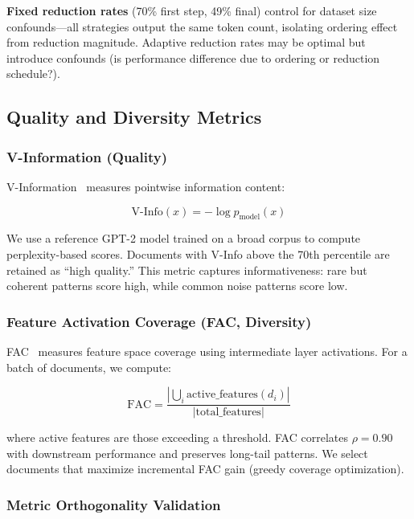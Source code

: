 \textbf{Fixed reduction rates} (70\% first step, 49\% final) control for dataset size confounds---all strategies output the same token count, isolating ordering effect from reduction magnitude. Adaptive reduction rates may be optimal but introduce confounds (is performance difference due to ordering or reduction schedule?).

\subsection{Quality and Diversity Metrics}

\subsubsection{V-Information (Quality)}

V-Information~\cite{vinfo2025} measures pointwise information content:

\begin{equation}
\text{V-Info}(x) = -\log p_{\text{model}}(x)
\end{equation}

We use a reference GPT-2 model trained on a broad corpus to compute perplexity-based scores. Documents with V-Info above the 70th percentile are retained as ``high quality.'' This metric captures informativeness: rare but coherent patterns score high, while common noise patterns score low.

\subsubsection{Feature Activation Coverage (FAC, Diversity)}

FAC~\cite{fac2026} measures feature space coverage using intermediate layer activations. For a batch of documents, we compute:

\begin{equation}
\text{FAC} = \frac{|\bigcup_{i} \text{active\_features}(d_i)|}{|\text{total\_features}|}
\end{equation}

where active features are those exceeding a threshold. FAC correlates $\rho=0.90$ with downstream performance and preserves long-tail patterns. We select documents that maximize incremental FAC gain (greedy coverage optimization).

\subsubsection{Metric Orthogonality Validation}

